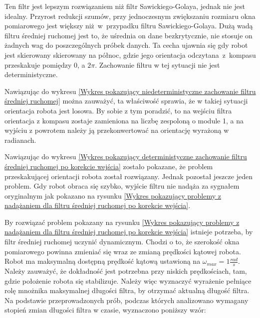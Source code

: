 {{{            Ten filtr jest lepszym rozwiązaniem niż filtr Sawickiego-Golaya, jednak nie jest idealny. Przyrost redukcji szumów, przy jednoczesnym zwiększaniu rozmiaru okna pomiarowego jest większy niż~w~przypadku filtru Sawickiego-Golaya.  Dużą wadą filtru średniej ruchomej jest to, że uśrednia on dane bezkrytycznie, nie stosuje on żadnych wag do poszczególnych próbek danych. Ta cecha ujawnia się gdy robot jest skierowany skierowany na północ, gdzie jego orientacja odczytana~z~kompasu przeskakuje pomiędzy 0, a $2\pi$. Zachowanie filtru w tej sytuacji nie jest deterministyczne.


            Nawiązując do wykresu \ref{Wykres pokazujący niedeterministyczne zachowanie filtru średniej ruchomej} można zauważyć, ta właściwość sprawia, że w takiej sytuacji orientacja robota jest losowa. By sobie z tym poradzić, to na wejściu filtra orientacja z kompasu zostaje zamieniona na liczbę zespoloną o module 1, a na wyjściu z powrotem należy ją przekonwertować na orientację wyrażoną w radianach.


            \newpage
            Nawiązując do wykresu \ref{Wykres pokazujący deterministyczne zachowanie filtru średniej ruchomej po korekcie wejścia} zostało pokazane, że problem przeskakującej orientacji robota został rozwiązany. Jednak pozostał jeszcze jeden problem. Gdy robot obraca się szybko, wyjście filtru nie nadąża za sygnałem oryginalnym jak pokazano na rysunku \ref{Wykres pokazujący problemy z nadążaniem dla filtru średniej ruchomej po korekcie wejścia}.


            \newpage
            By rozwiązać problem pokazany na rysunku \ref{Wykres pokazujący problemy z nadążaniem dla filtru średniej ruchomej po korekcie wejścia} istnieje potrzeba, by filtr średniej ruchomej uczynić dynamicznym. Chodzi o to, że szerokość okna pomiarowego powinna zmieniać się wraz ze zmianą prędkości kątowej robota. Robot ma maksymalną dostępną prędkość kątową ustawioną na $\omega_{max}=1 \frac{rad}{s}$. Należy zauważyć, że dokładność jest potrzebna przy niskich prędkościach, tam, gdzie położenie robota się stabilizuje. Należy więc wyznaczyć wyrażenie pełniące rolę mnożnika maksymalnej długości filtra, by otrzymać aktualną długość filtra. Na podstawie przeprowadzonych prób, podczas których analizowano wymagany stopień zmian długości filtra w czasie, wyznaczono poniższy wzór:

}}}
